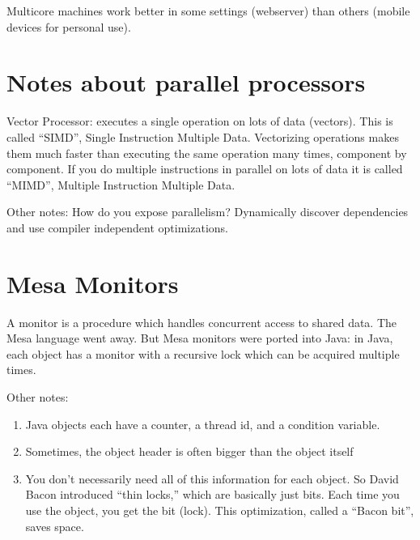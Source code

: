\documentclass[twoside]{article}
\begin{document}
Multicore machines work better in some settings (webserver) than others (mobile devices for personal use).

\section{Notes about parallel processors}
Vector Processor: executes a single operation on lots of data (vectors). This is called ``SIMD'', Single Instruction Multiple Data. Vectorizing operations makes them much faster than executing the same operation many times, component by component. If you do multiple instructions in parallel on lots of data it is called ``MIMD'', Multiple Instruction Multiple Data.

Other notes: How do you expose parallelism? Dynamically discover dependencies and use compiler independent optimizations.

\section*{Mesa Monitors}

A monitor is a procedure which handles concurrent access to shared data. The Mesa language went away. But Mesa monitors were ported into Java: in Java, each object has a monitor with a recursive lock which can be acquired multiple times.

Other notes:

\begin{enumerate}
    \item Java objects each have a counter, a thread id, and a condition variable. 
    \item Sometimes, the object header is often bigger than the object itself
    \item You don't necessarily need all of this information for each object. So David Bacon introduced ``thin locks,'' which are basically just bits. Each time you use the object, you get the bit (lock). This optimization, called a ``Bacon bit'', saves space.
\end{enumerate}
\end{document}
